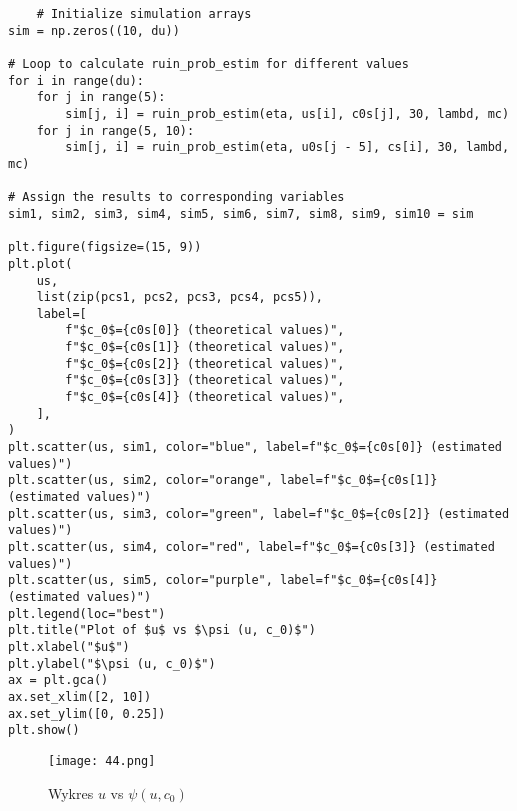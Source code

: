 \documentclass[12pt,letterpaper]{article}
\theoremstyle{definition}
\begin{document}
\begin{lstlisting}
    # Initialize simulation arrays
sim = np.zeros((10, du))

# Loop to calculate ruin_prob_estim for different values
for i in range(du):
    for j in range(5):
        sim[j, i] = ruin_prob_estim(eta, us[i], c0s[j], 30, lambd, mc)
    for j in range(5, 10):
        sim[j, i] = ruin_prob_estim(eta, u0s[j - 5], cs[i], 30, lambd, mc)

# Assign the results to corresponding variables
sim1, sim2, sim3, sim4, sim5, sim6, sim7, sim8, sim9, sim10 = sim

plt.figure(figsize=(15, 9))
plt.plot(
    us,
    list(zip(pcs1, pcs2, pcs3, pcs4, pcs5)),
    label=[
        f"$c_0$={c0s[0]} (theoretical values)",
        f"$c_0$={c0s[1]} (theoretical values)",
        f"$c_0$={c0s[2]} (theoretical values)",
        f"$c_0$={c0s[3]} (theoretical values)",
        f"$c_0$={c0s[4]} (theoretical values)",
    ],
)
plt.scatter(us, sim1, color="blue", label=f"$c_0$={c0s[0]} (estimated values)")
plt.scatter(us, sim2, color="orange", label=f"$c_0$={c0s[1]} (estimated values)")
plt.scatter(us, sim3, color="green", label=f"$c_0$={c0s[2]} (estimated values)")
plt.scatter(us, sim4, color="red", label=f"$c_0$={c0s[3]} (estimated values)")
plt.scatter(us, sim5, color="purple", label=f"$c_0$={c0s[4]} (estimated values)")
plt.legend(loc="best")
plt.title("Plot of $u$ vs $\psi (u, c_0)$")
plt.xlabel("$u$")
plt.ylabel("$\psi (u, c_0)$")
ax = plt.gca()
ax.set_xlim([2, 10])
ax.set_ylim([0, 0.25])
plt.show()

\end{lstlisting}
\begin{figure}[h!]
    \centering
    \texttt{[image: 44.png]} 


    \caption{Wykres $u$ vs $\psi (u, c_0)$}

\end{figure}
\end{document}
